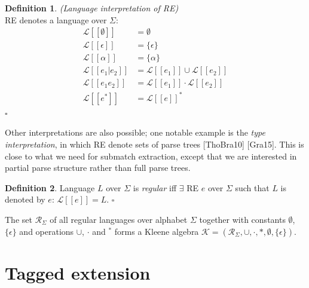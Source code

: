 \documentclass{article}
\newcommand{\Xeq}{\!=\!}
\newcommand{\Xlb}{[\![}
\newcommand{\Xrb}{]\!]}
\newcommand{\XL}{\mathcal{L}}
\theoremstyle{definition}
\newtheorem{Xdef}{Definition}
\begin{document}
\begin{multicols}{2}
    \begin{Xdef}
    \emph{(Language interpretation of RE)} \\
    RE denotes a language over $\Sigma$:
    \begin{align*}
        \XL \Xlb \emptyset \Xrb &= \emptyset \\
        \XL \Xlb \epsilon \Xrb &= \{ \epsilon \} \\
        \XL \Xlb \alpha \Xrb &= \{\alpha\} \\
        \XL \Xlb e_1 | e_2 \Xrb &= \XL \Xlb e_1 \Xrb \cup \XL \Xlb e_2 \Xrb \\
        \XL \Xlb e_1 e_2 \Xrb &= \XL \Xlb e_1 \Xrb \cdot \XL \Xlb e_2 \Xrb \\
        \XL \Xlb e^* \Xrb &= \XL \Xlb e \Xrb ^*
    \end{align*}
    $\square$
    \end{Xdef}

Other interpretations are also possible;
one notable example is the \emph{type interpretation},
in which RE denote sets of parse trees [ThoBra10] [Gra15].
This is close to what we need for submatch extraction,
except that we are interested in partial parse structure rather than full parse trees.

    \begin{Xdef}
    Language $L$ over $\Sigma$ is \emph{regular} iff $\exists$ RE $e$ over $\Sigma$
    such that $L$ is denoted by $e$: $\XL \Xlb e \Xrb \Xeq L$.
    $\square$
    \end{Xdef}

The set $\mathcal{R}_\Sigma$ of all regular languages over alphabet $\Sigma$
together with constants $\emptyset$, $\{ \epsilon \}$ and operations $\cup$, $\cdot$ and ${}^*$
forms a Kleene algebra $\mathcal{K} \Xeq (\mathcal{R}_\Sigma, \cup, \cdot, *, \emptyset, \{ \epsilon \})$.

\section{Tagged extension}\label{section_tagged_extension}


\end{multicols}
\end{document}
